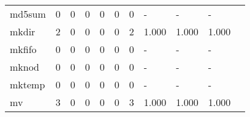 \begin{longtable}{lp{1.20cm}p{1.20cm}p{1.20cm}p{1.20cm}p{1.20cm}p{1.20cm}p{1.20cm}p{1.20cm}p{1.20cm}p{1.20cm}}
md5sum    &                                     0 &                                                  0 &                                                  0 &                                                  0 &                                                  0 &                                                  0 &                                             - &                                                  - &                                                  - \\
mkdir     &                                     2 &                                                  0 &                                                  0 &                                                  0 &                                                  0 &                                                  2 &                                         1.000 &                                              1.000 &                                              1.000 \\
mkfifo    &                                     0 &                                                  0 &                                                  0 &                                                  0 &                                                  0 &                                                  0 &                                             - &                                                  - &                                                  - \\
mknod     &                                     0 &                                                  0 &                                                  0 &                                                  0 &                                                  0 &                                                  0 &                                             - &                                                  - &                                                  - \\
mktemp    &                                     0 &                                                  0 &                                                  0 &                                                  0 &                                                  0 &                                                  0 &                                             - &                                                  - &                                                  - \\
mv        &                                     3 &                                                  0 &                                                  0 &                                                  0 &                                                  0 &                                                  3 &                                         1.000 &                                              1.000 &                                              1.000 \\

\end{longtable}
